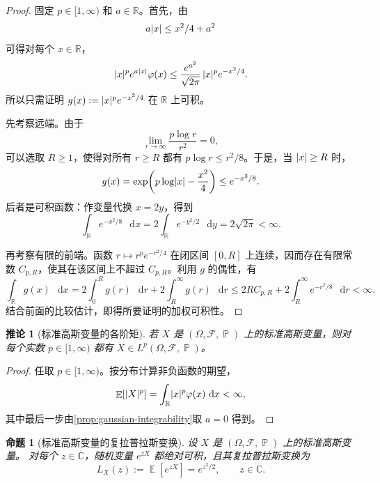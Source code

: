 \documentclass[UTF8,11pt,a4paper,oneside,fontset=fandol]{ctexrep}
\numberwithin{equation}{section}
\theoremstyle{plain}
\newtheorem{proposition}[theorem]{命题}
\newtheorem{corollary}[theorem]{推论}
\theoremstyle{definition}
\theoremstyle{remark}
\newcommand{\R}{\mathbb{R}}
\newcommand{\C}{\mathbb{C}}
\newcommand{\F}{\mathcal{F}}
\DeclareMathOperator{\Prob}{\mathbb{P}}
\DeclareMathOperator{\E}{\mathbb{E}}
\newcommand{\dd}{\mathop{}\!\mathrm{d}}
\DeclarePairedDelimiter{\abs}{\lvert}{\rvert}
\begin{document}
\begin{proof}
固定 $p\in[1,\infty)$ 和 $a\in\R$。首先，由
\[
  a\abs{x}\le x^2/4+a^2
\]
可得对每个 $x\in\R$，
\[
  \abs{x}^{p}e^{a\abs{x}}\varphi(x)
  \le\frac{e^{a^2}}{\sqrt{2\pi}}\,
       \abs{x}^{p}e^{-x^2/4}.
\]
所以只需证明 $g(x):=\abs{x}^{p}e^{-x^2/4}$ 在 $\R$ 上可积。

先考察远端。由于
\[
  \lim_{r\to\infty}\frac{p\log r}{r^2}=0,
\]
可以选取 $R\ge1$，使得对所有 $r\ge R$ 都有
$p\log r\le r^2/8$。于是，当 $\abs{x}\ge R$ 时，
\[
  g(x)
  =\exp\!\left(p\log\abs{x}-\frac{x^2}{4}\right)
  \le e^{-x^2/8}.
\]
后者是可积函数：作变量代换 $x=2y$，得到
\[
  \int_{\R}e^{-x^2/8}\,\dd x
  =2\int_{\R}e^{-y^2/2}\,\dd y
  =2\sqrt{2\pi}<\infty.
\]

再考察有限的前端。函数 $r\mapsto r^p e^{-r^2/4}$ 在闭区间
$[0,R]$ 上连续，因而存在有限常数 $C_{p,R}$，使其在该区间上不超过
$C_{p,R}$。利用 $g$ 的偶性，有
\[
  \int_{\R}g(x)\,\dd x
  =2\int_0^R g(r)\,\dd r+2\int_R^\infty g(r)\,\dd r
  \le 2RC_{p,R}+2\int_R^\infty e^{-r^2/8}\,\dd r
  <\infty.
\]
结合前面的比较估计，即得所要证明的加权可积性。
\end{proof}

\begin{corollary}[标准高斯变量的各阶矩]
\label{cor:gaussian-lp}
若 $X$ 是 $(\Omega,\F,\Prob)$ 上的标准高斯变量，则对每个实数
$p\in[1,\infty)$ 都有 $X\in L^p(\Omega,\F,\Prob)$。
\end{corollary}

\begin{proof}
任取 $p\in[1,\infty)$。按分布计算非负函数的期望，
\[
  \E\!\left[\abs{X}^{p}\right]
  =\int_{\R}\abs{x}^{p}\varphi(x)\,\dd x
  <\infty,
\]
其中最后一步由\cref{prop:gaussian-integrability}取 $a=0$ 得到。
\end{proof}

\begin{proposition}[标准高斯变量的复拉普拉斯变换]
\label{prop:gaussian-laplace}
设 $X$ 是 $(\Omega,\F,\Prob)$ 上的标准高斯变量。
对每个 $z\in\C$，随机变量 $e^{zX}$ 都绝对可积，且其复拉普拉斯变换为
\begin{equation}
  \label{eq:gaussian-laplace}
  L_X(z):=\E\!\left[e^{zX}\right]=e^{z^2/2},
  \qquad z\in\C.
\end{equation}
\end{proposition}
\end{document}
